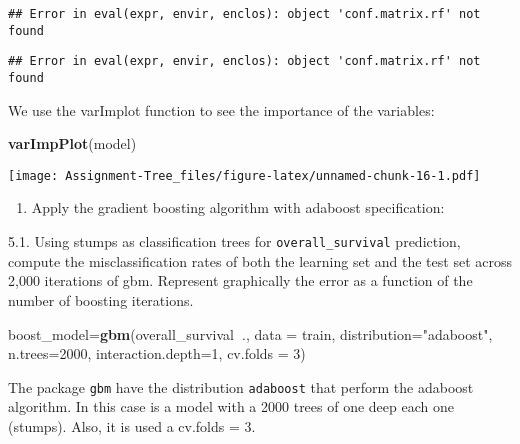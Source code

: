 \documentclass[
]{article}
\newenvironment{Shaded}{\begin{snugshade}}{\end{snugshade}}
\newcommand{\DataTypeTok}[1]{\textcolor[rgb]{0.13,0.29,0.53}{#1}}
\newcommand{\DecValTok}[1]{\textcolor[rgb]{0.00,0.00,0.81}{#1}}
\newcommand{\KeywordTok}[1]{\textcolor[rgb]{0.13,0.29,0.53}{\textbf{#1}}}
\newcommand{\NormalTok}[1]{#1}
\newcommand{\OperatorTok}[1]{\textcolor[rgb]{0.81,0.36,0.00}{\textbf{#1}}}
\newcommand{\StringTok}[1]{\textcolor[rgb]{0.31,0.60,0.02}{#1}}
\providecommand{\tightlist}{%
  \setlength{\itemsep}{0pt}\setlength{\parskip}{0pt}}
\begin{document}
\begin{verbatim}
## Error in eval(expr, envir, enclos): object 'conf.matrix.rf' not found
\end{verbatim}

\begin{verbatim}
## Error in eval(expr, envir, enclos): object 'conf.matrix.rf' not found
\end{verbatim}

We use the varImplot function to see the importance of the variables:

\begin{Shaded}
\begin{Highlighting}[]
\KeywordTok{varImpPlot}\NormalTok{(model)}
\end{Highlighting}
\end{Shaded}

\texttt{[image: Assignment-Tree\_files/figure-latex/unnamed-chunk-16-1.pdf]}

\begin{enumerate}
\def\labelenumi{\arabic{enumi}.}
\setcounter{enumi}{4}
\tightlist
\item
  Apply the gradient boosting algorithm with adaboost specification:
\end{enumerate}

5.1. Using stumps as classification trees for \texttt{overall\_survival}
prediction, compute the misclassification rates of both the learning set
and the test set across 2,000 iterations of gbm. Represent graphically
the error as a function of the number of boosting iterations.

\begin{Shaded}
\begin{Highlighting}[]
\NormalTok{boost_model=}\KeywordTok{gbm}\NormalTok{(overall_survival}\OperatorTok{~}\NormalTok{.,}
                \DataTypeTok{data =}\NormalTok{ train, }
                \DataTypeTok{distribution=}\StringTok{"adaboost"}\NormalTok{, }
                \DataTypeTok{n.trees=}\DecValTok{2000}\NormalTok{, }\DataTypeTok{interaction.depth=}\DecValTok{1}\NormalTok{, }
                \DataTypeTok{cv.folds =} \DecValTok{3}\NormalTok{)}
\end{Highlighting}
\end{Shaded}

The package \texttt{gbm} have the distribution \texttt{adaboost} that
perform the adaboost algorithm. In this case is a model with a 2000
trees of one deep each one (stumps). Also, it is used a cv.folds = 3.
\end{document}
